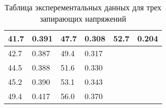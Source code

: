 \begin{table}[]
\begin{tabular}{|ll|ll|ll|}
    \multicolumn{1}{|l|}{41.7}              & 0.391                & \multicolumn{1}{l|}{47.7}              & 0.308               & \multicolumn{1}{l|}{52.7}              & 0.204               \\ \hline
    \multicolumn{1}{|l|}{42.7}              & 0.387                & \multicolumn{1}{l|}{49.4}              & 0.317               & \multicolumn{1}{l|}{}                  &                     \\ \hline
    \multicolumn{1}{|l|}{44.5}              & 0.388                & \multicolumn{1}{l|}{51.6}              & 0.330               & \multicolumn{1}{l|}{}                  &                     \\ \hline
    \multicolumn{1}{|l|}{45.2}              & 0.390                & \multicolumn{1}{l|}{53.1}              & 0.343               & \multicolumn{1}{l|}{}                  &                     \\ \hline
    \multicolumn{1}{|l|}{49.4}              & 0.417                & \multicolumn{1}{l|}{56.0}              & 0.370               & \multicolumn{1}{l|}{}                  &                     \\ \hline
    \end{tabular}
    \caption{Таблица эксперементальных данных для трех запирающих напряжений}
    \label{tab:data}
    \end{table}